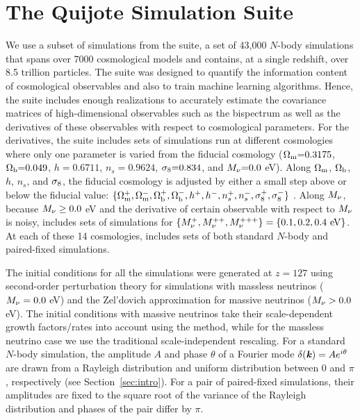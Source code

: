 \section{The Quijote Simulation Suite} \label{sec:sims}
We use a subset of simulations from the \quij suite, a set of 43,000 $N$-body 
simulations that spans over 7000 cosmological models and contains, at a single 
redshift, over 8.5 trillion particles. The \quij suite was designed to quantify
the information content of cosmological observables and also to train machine 
learning algorithms. Hence, the suite includes enough realizations to accurately 
estimate the covariance matrices of high-dimensional observables such as the 
bispectrum as well as the derivatives of these observables with respect to 
cosmological parameters. For the derivatives, the suite includes sets of 
simulations run at different cosmologies where only one parameter is varied 
from the fiducial cosmology  
($\Omega_{\rm m}{=}0.3175$, $\Omega_{\rm b}{=}0.049$, $h{=}0.6711$, $n_s{=}0.9624$, $\sigma_8{=}0.834$, 
and $M_\nu{=}0.0$ eV). Along $\Omega_{\rm m}$, $\Omega_{\rm b}$, $h$, $n_s$, and $\sigma_8$, the fiducial 
cosmology is adjusted by either a small step above or below the fiducial value:
$\{\Omega_{\rm m}^{+}, \Omega_{\rm m}^{-}, \Omega_{\rm b}^{+}, \Omega_{\rm b}^{-}, h^+, h^-, n_s^{+}, n_s^{-}, \sigma_8^{+}, \sigma_8^-\}$ . 
Along $M_\nu$, because $M_\nu \ge 0.0$ eV and the derivative of certain observable 
with respect to $M_\nu$ is noisy, \quij includes sets of simulations for 
$\{M_\nu^{+}, M_\nu^{++}, M_\nu^{+++} \} = \{0.1, 0.2, 0.4~{\rm eV}\}$.
At each of these 14 cosmologies, \quij includes sets of both standard $N$-body and 
paired-fixed simulations. 

The initial conditions for all the simulations were generated at $z=127$ using 
second-order perturbation theory for simulations with massless neutrinos 
($M_\nu = 0.0$ eV) and the Zel’dovich approximation for massive neutrinos 
($M_\nu > 0.0$ eV). The initial conditions with massive neutrinos take 
their scale-dependent growth factors/rates into account using the 
\cite{zennaro2017a} method, while for the massless neutrino case we use 
the traditional scale-independent rescaling. For a standard $N$-body simulation, 
the amplitude $A$ and phase $\theta$ of a Fourier mode $\delta(\textbf{\textit{k}}) = A e^{i\theta}$ 
are drawn from a Rayleigh distribution and uniform distribution between 
0 and $\pi$, respectively (see Section~\ref{sec:intro}). For a pair of 
paired-fixed simulations, their amplitudes are fixed to the square root 
of the variance of the Rayleigh distribution and phases of the pair 
differ by $\pi$. 

